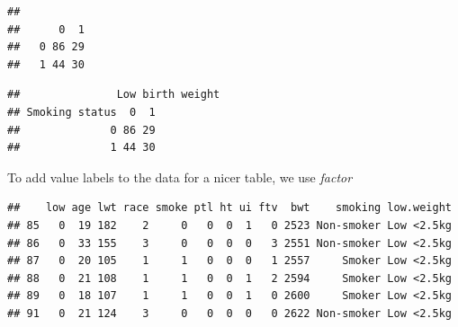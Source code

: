 \documentclass[]{book}
\newenvironment{Shaded}{\begin{snugshade}}{\end{snugshade}}
\newcommand{\KeywordTok}[1]{\textcolor[rgb]{0.13,0.29,0.53}{\textbf{#1}}}
\newcommand{\DataTypeTok}[1]{\textcolor[rgb]{0.13,0.29,0.53}{#1}}
\newcommand{\DecValTok}[1]{\textcolor[rgb]{0.00,0.00,0.81}{#1}}
\newcommand{\StringTok}[1]{\textcolor[rgb]{0.31,0.60,0.02}{#1}}
\newcommand{\CommentTok}[1]{\textcolor[rgb]{0.56,0.35,0.01}{\textit{#1}}}
\newcommand{\OperatorTok}[1]{\textcolor[rgb]{0.81,0.36,0.00}{\textbf{#1}}}
\newcommand{\NormalTok}[1]{#1}
\theoremstyle{definition}
\theoremstyle{definition}
\theoremstyle{remark}
\begin{document}
\begin{verbatim}
##    
##      0  1
##   0 86 29
##   1 44 30
\end{verbatim}

\begin{Shaded}
\end{Shaded}

\begin{verbatim}
##               Low birth weight
## Smoking status  0  1
##              0 86 29
##              1 44 30
\end{verbatim}

To add value labels to the data for a nicer table, we use \emph{factor}

\begin{Shaded}
\end{Shaded}

\begin{verbatim}
##    low age lwt race smoke ptl ht ui ftv  bwt    smoking low.weight
## 85   0  19 182    2     0   0  0  1   0 2523 Non-smoker Low <2.5kg
## 86   0  33 155    3     0   0  0  0   3 2551 Non-smoker Low <2.5kg
## 87   0  20 105    1     1   0  0  0   1 2557     Smoker Low <2.5kg
## 88   0  21 108    1     1   0  0  1   2 2594     Smoker Low <2.5kg
## 89   0  18 107    1     1   0  0  1   0 2600     Smoker Low <2.5kg
## 91   0  21 124    3     0   0  0  0   0 2622 Non-smoker Low <2.5kg
\end{verbatim}
\end{document}

